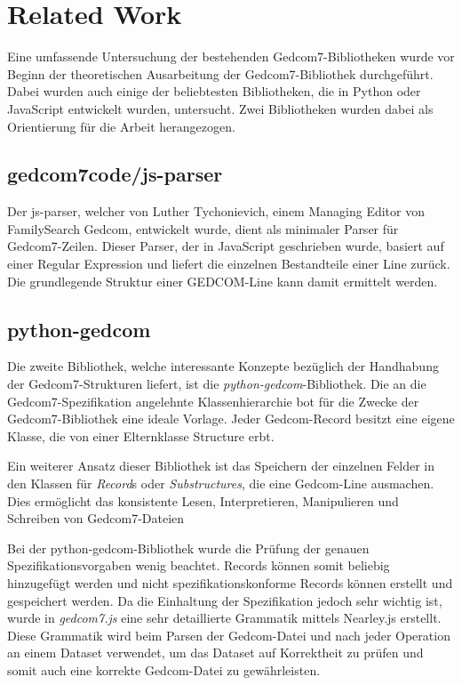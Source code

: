 \chapter{Related Work}
\label{chap: Related Work}
Eine umfassende Untersuchung der bestehenden Gedcom7-Bibliotheken wurde vor Beginn der theoretischen Ausarbeitung der Gedcom7-Bibliothek durchgeführt. 
Dabei wurden auch einige der beliebtesten Bibliotheken, die in Python oder JavaScript entwickelt wurden, untersucht. Zwei Bibliotheken wurden dabei als Orientierung 
für die Arbeit herangezogen.

\section{gedcom7code/js-parser}

Der js-parser, welcher von Luther Tychonievich, einem Managing Editor von FamilySearch Gedcom, entwickelt wurde, dient als minimaler Parser für Gedcom7-Zeilen. 
Dieser Parser, der in JavaScript geschrieben wurde, basiert auf einer Regular Expression und liefert die einzelnen Bestandteile einer Line zurück. Die grundlegende 
Struktur einer GEDCOM-Line kann damit ermittelt werden.

\section{python-gedcom}

Die zweite Bibliothek, welche interessante Konzepte bezüglich der Handhabung der Gedcom7-Strukturen liefert, ist die \textit{python-gedcom}-Bibliothek. 
Die an die Gedcom7-Spezifikation angelehnte Klassenhierarchie bot für die Zwecke der Gedcom7-Bibliothek eine ideale Vorlage. Jeder Gedcom-Record besitzt eine eigene Klasse, 
die von einer Elternklasse Structure erbt.

Ein weiterer Ansatz dieser Bibliothek ist das Speichern der einzelnen Felder in den Klassen für \textit{Record}s oder \textit{Substructures}, die eine Gedcom-Line ausmachen. 
Dies ermöglicht das konsistente Lesen, Interpretieren, Manipulieren und Schreiben von Gedcom7-Dateien

Bei der python-gedcom-Bibliothek wurde die Prüfung der genauen Spezifikationsvorgaben wenig beachtet. Records können somit beliebig
hinzugefügt werden und nicht spezifikationskonforme Records können erstellt und gespeichert werden.
\newpage
Da die Einhaltung der Spezifikation jedoch sehr wichtig ist, wurde in \textit{gedcom7.js} eine sehr detaillierte Grammatik mittels Nearley.js erstellt. Diese Grammatik wird
beim Parsen der Gedcom-Datei und nach jeder Operation an einem Dataset verwendet, um das Dataset auf Korrektheit zu prüfen und somit auch eine korrekte Gedcom-Datei
zu gewährleisten.